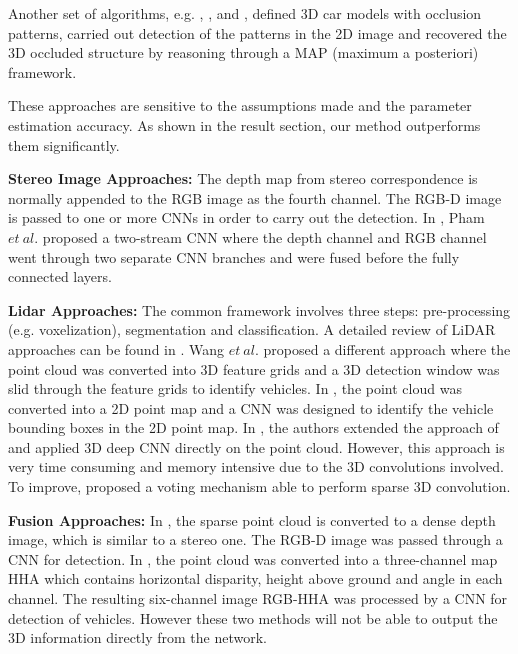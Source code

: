 \documentclass[letterpaper, 10 pt, conference]{ieeeconf}  \usepackage[
\begin{document}
Another set of algorithms, e.g. \cite{xiang2015data}, \cite{xiang2017subcategory}, \cite{zeeshan2014cars} and \cite{zeeshan2013explicit}, defined 3D car models with occlusion patterns, carried out detection of the patterns in the 2D image and recovered the 3D occluded structure by reasoning through a MAP (maximum a posteriori) framework.

These approaches are sensitive to the assumptions made and the parameter estimation accuracy. As shown in the result section, our method outperforms them significantly.

\textbf{Stereo Image Approaches:} The depth map from stereo correspondence is normally appended to the RGB image as the fourth channel. The RGB-D image is passed to one or more CNNs in order to carry out the detection. In \cite{Pham2017}, Pham $et~al.$ proposed a two-stream CNN where the depth channel and RGB channel went through two separate CNN branches and were fused before the fully connected layers. 

\textbf{Lidar Approaches:} The common framework involves three steps: pre-processing (e.g. voxelization), segmentation and classification. A detailed review of LiDAR approaches can be found in \cite{pendleton2017perception}. Wang $et~al.$ \cite{wang2015voting} proposed a different approach where the point cloud was converted into 3D feature grids and a 3D detection window was slid through the feature grids to identify vehicles. In \cite{li2016vehicle}, the point cloud was converted into a 2D point map and a CNN was designed to identify the vehicle bounding boxes in the 2D point map. In \cite{li20163d}, the authors extended the approach of \cite{li2016vehicle} and applied 3D deep CNN directly on the point cloud. However, this approach is very time consuming and memory intensive due to the 3D convolutions involved. To improve, \cite{engelcke2017vote3deep} proposed a voting mechanism able to perform sparse 3D convolution.

\textbf{Fusion Approaches:} In \cite{eitel2015multimodal}, the sparse point cloud is converted to a dense depth image, which is similar to a stereo one. The RGB-D image was passed through a CNN for detection. In \cite{schlosser2016fusing}, the point cloud was converted into a three-channel map HHA which contains horizontal disparity, height above ground and angle in each channel. The resulting six-channel image RGB-HHA was processed by a CNN for detection of vehicles. However these two methods will not be able to output the 3D information directly from the network.
\end{document}
